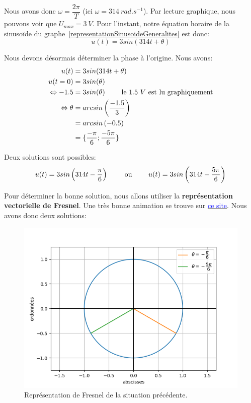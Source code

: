 \documentclass[12pt,a4paper,openany]{book}
\begin{document}
Nous avons donc $ \omega = \dfrac{2\pi}{T} $ (ici $ \omega = 314~rad.s^{-1} $). Par lecture graphique, nous pouvons voir que $ U_{max} = 3~V $. Pour l'instant, notre équation horaire de la sinusoïde du graphe~\ref{representationSinusoideGeneralites} est donc:
\begin{equation*}
u(t) = 3sin(314t + \theta)
\end{equation*}

Nous devons désormais déterminer la phase à l'origine. Nous avons:
\begin{align*}
u(t) & = 3sin(314t + \theta)\\
u(t=0) & = 3sin(\theta)\\
\Leftrightarrow -1.5 & = 3sin(\theta) \text{\hspace{20px} le $ 1.5~V $ est lu graphiquement}\\
\Leftrightarrow \theta & = arcsin\left(\dfrac{-1.5}{3}\right)\\
					   & = arcsin\left(-0.5\right)\\
					   & = \{\dfrac{-\pi}{6}; \dfrac{-5\pi}{6}\}
\end{align*}

Deux solutions sont possibles:
\begin{equation*}
u(t) = 3sin\left(314t - \dfrac{\pi}{6}\right) \text{\hspace{20px} ou \hspace{20px}} u(t) = 3sin\left(314t - \dfrac{5\pi}{6}\right)
\end{equation*}

Pour déterminer la bonne solution, nous allons utiliser la \textbf{représentation vectorielle de Fresnel}. Une très bonne animation se trouve sur \href{https://phyanim.sciences.univ-nantes.fr/Elec/Alternatif/Fresnel_FJ.php}{\textcolor{blue}{ce site}}. Nous avons donc deux solutions:
\begin{figure}[!h]
\begin{center}
\includegraphics[scale=0.8]{Images/fresnelSinusoideGeneralites.png} 
\caption{Représentation de Fresnel de la situation précédente.}
\label{fresnelSinusoideGeneralites}
\end{center}
\end{figure}
\end{document}
